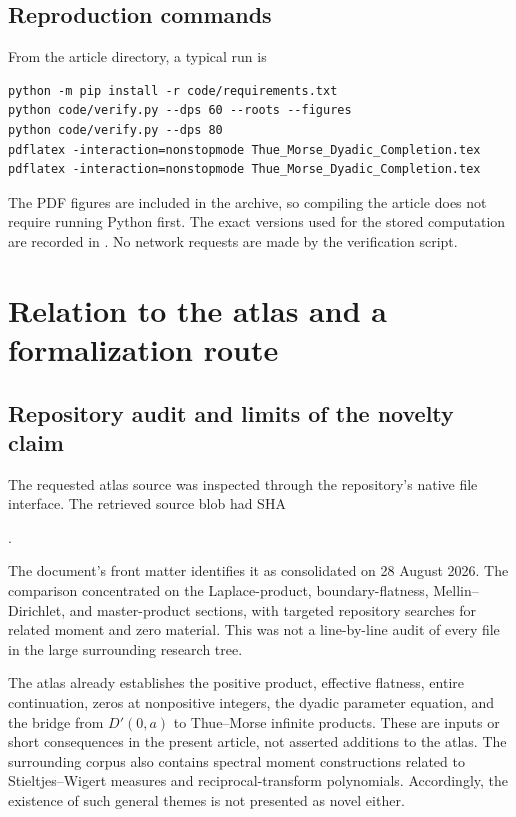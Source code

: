 \documentclass[11pt,a4paper]{article}
\numberwithin{equation}{section}
\theoremstyle{definition}
\theoremstyle{remark}
\begin{document}
\subsection{Reproduction commands}
From the article directory, a typical run is
\begin{lstlisting}
python -m pip install -r code/requirements.txt
python code/verify.py --dps 60 --roots --figures
python code/verify.py --dps 80
pdflatex -interaction=nonstopmode Thue_Morse_Dyadic_Completion.tex
pdflatex -interaction=nonstopmode Thue_Morse_Dyadic_Completion.tex
\end{lstlisting}
The PDF figures are included in the archive, so compiling the article
does not require running Python first. The exact versions used for
the stored computation are recorded in .
No network requests are made by the verification script.

\section{Relation to the atlas and a formalization route}
\label{sec:audit}

\subsection{Repository audit and limits of the novelty claim}
The requested atlas source was inspected through the repository's
native file interface. The retrieved source blob had SHA
\begin{center}\small{}.\end{center}
The document's front matter identifies it as consolidated on
28 August 2026. The comparison concentrated on the Laplace-product,
boundary-flatness, Mellin--Dirichlet, and master-product sections,
with targeted repository searches for related moment and zero
material. This was not a line-by-line audit of every file in the
large surrounding research tree.

The atlas already establishes the positive product, effective
flatness, entire continuation, zeros at nonpositive integers, the
dyadic parameter equation, and the bridge from $D'(0,a)$ to
Thue--Morse infinite products. These are inputs or short consequences
in the present article, not asserted additions to the atlas.
The surrounding corpus also contains spectral moment constructions
related to Stieltjes--Wigert measures and reciprocal-transform
polynomials. Accordingly, the existence of such general themes is
not presented as novel either.
\end{document}
